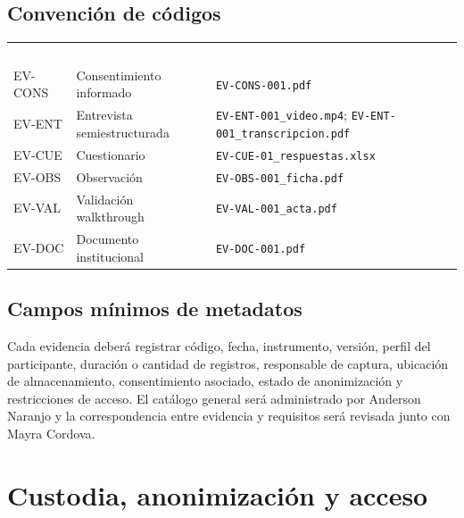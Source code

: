 \documentclass[10pt,a4paper]{article}
\begin{document}
\subsection{Convención de códigos}

\noindent\begin{tabularx}{\textwidth}{C{2.6cm} L{4.1cm} J}
\textcolor{white}{\textbf{Prefijo}} &
\textcolor{white}{\textbf{Tipo de evidencia}} &
\textcolor{white}{\textbf{Ejemplo}}\\
EV-CONS & Consentimiento informado & \texttt{EV-CONS-001.pdf}\\
EV-ENT & Entrevista semiestructurada & \texttt{EV-ENT-001\_video.mp4}; \texttt{EV-ENT-001\_transcripcion.pdf}\\
EV-CUE & Cuestionario & \texttt{EV-CUE-01\_respuestas.xlsx}\\
EV-OBS & Observación & \texttt{EV-OBS-001\_ficha.pdf}\\
EV-VAL & Validación walkthrough & \texttt{EV-VAL-001\_acta.pdf}\\
EV-DOC & Documento institucional & \texttt{EV-DOC-001.pdf}\\
\end{tabularx}

\subsection{Campos mínimos de metadatos}

Cada evidencia deberá registrar código, fecha, instrumento, versión, perfil del participante, duración o cantidad de registros, responsable de captura, ubicación de almacenamiento, consentimiento asociado, estado de anonimización y restricciones de acceso. El catálogo general será administrado por Anderson Naranjo y la correspondencia entre evidencia y requisitos será revisada junto con Mayra Cordova.

\section{Custodia, anonimización y acceso}
\end{document}
